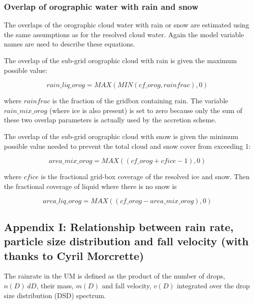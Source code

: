 \documentclass{UMDP_article}
\begin{document}
\subsubsection{Overlap of orographic water with rain and snow}

The overlaps of the orographic cloud water with rain or snow are estimated using the same assumptions as for the resolved cloud water.  Again the model variable names are used to describe these equations.  

The overlap of the sub-grid orographic cloud with rain is given the maximum possible value:

\begin{equation}
rain\_liq\_orog = MAX(  MIN(cf\_orog, rainfrac),  0 ) 
\end{equation}

where $rainfrac$ is the fraction of the gridbox containing rain.  The variable $rain\_mix\_orog$ (where ice is also present) is set to zero because only the sum of these two overlap parameters is actually used by the accretion scheme.  

The overlap of the sub-grid orographic cloud with snow is given the minimum possible value needed to prevent the total cloud and snow cover from exceeding 1:

\begin{equation}
area\_mix\_orog =  MAX( (cf\_orog + cfice - 1) ,0 )
\end{equation}

where $cfice$ is the fractional grid-box coverage of the resolved ice and snow.  Then the fractional coverage of liquid where there is no snow is

\begin{equation}
area\_liq\_orog = MAX( (cf\_orog - area\_mix\_orog), 0  ) 
\end{equation}


\clearpage
{}
{}
\subsection*{Appendix I: Relationship between rain rate, particle size distribution and fall velocity (with thanks to Cyril Morcrette)}
The rainrate in the UM is defined as the product of the number of drops, $n(D)~dD$, 
their mass, $m(D)$ and fall velocity, $v(D)$ integrated over the drop size distribution 
(DSD) spectrum.
\end{document}
